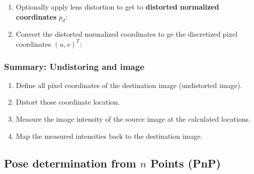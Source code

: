 \documentclass[10pt,a4paper]{scrartcl}
\begin{document}
\begin{multicols*}{2}
\begin{enumerate}
\item Optionally apply lens distortion to get to \textbf{distorted normalized coordinates} $p_d$:

\item Convert the distorted normalized coordinates to ge the discretized pixel coordinates $(u,v)^T$:

\end{enumerate}

\subsubsection{Summary: Undistoring and image}

\begin{enumerate}
\item Define all pixel coordinates of the destination image (undistorted image).
\item Distort those coordinate location.
\item Measure the image intensity of the source image at the calculated locations.
\item Map the measured intensities back to the destination image.
\end{enumerate}

\subsection{Pose determination from $n$ Points (PnP)}


\end{multicols*}
\end{document}
